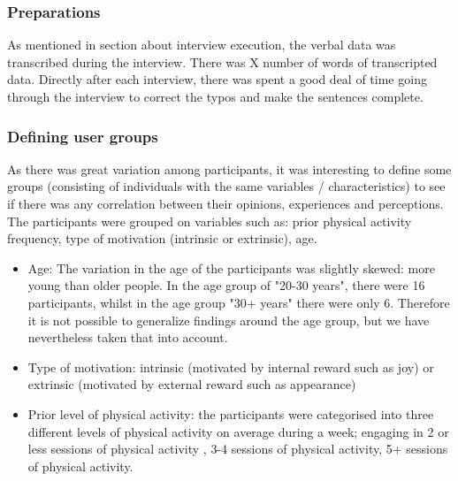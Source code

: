     
    \subsubsection{Preparations}
    As mentioned in section about interview execution, the verbal data was transcribed during the interview. There was X number of words of transcripted data. 
    Directly after each interview, there was spent a good deal of time going through the interview to correct the typos and make the sentences complete. 

    \subsubsection{Defining user groups}
    As there was great variation among participants, it was interesting to define some groups (consisting of individuals with the same variables / characteristics) to see if there was any correlation between their opinions, experiences and perceptions. The participants were grouped on variables such as: prior physical activity frequency, type of motivation (intrinsic or extrinsic), age.
    
    \begin{itemize}
    \item Age: The variation in the age of the participants was slightly skewed: more young than older people. In the age group of "20-30 years", there were 16 participants, whilst in the age group "30+ years" there were only 6. Therefore it is not possible to generalize findings around the age group, but we have nevertheless taken that into account.
    \item     Type of motivation: intrinsic (motivated by internal reward such as joy) or extrinsic (motivated by external reward such as appearance)
    \item     Prior level of physical activity: the participants were categorised into three different levels of physical activity on average during a week; engaging in 2 or less sessions of physical activity , 3-4 sessions of physical activity, 5+ sessions of physical activity. 
    \end{itemize}
    
